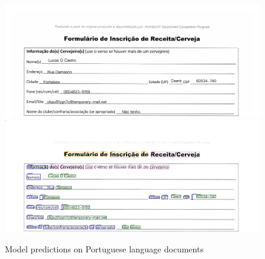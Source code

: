 \begin{figure}[!ht]
\centering
\includegraphics[width=1\textwidth]{chapters/images/experiments_and_results/original/pt_train_11.jpg}\hfill
\includegraphics[width=1\textwidth]{chapters/images/experiments_and_results/results/pt_train_11_Result.jpg}
% 
\caption{Model predictions on Portuguese language documents}
    \label{fig:result_lang_pt}
\end{figure}


